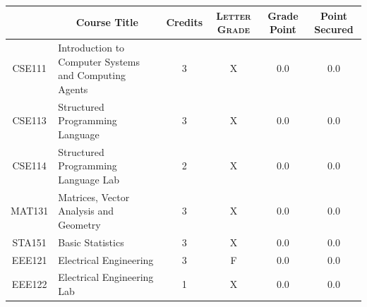 \documentclass[11pt]{article}
\newcommand*{\numtwo}[1]{\pgfmathprintnumber[
                    fixed, precision=2, fixed zerofill=true]{#1}}
\begin{document}
                \begin{center}
                    \renewcommand{\arraystretch}{1.08}
                    
                \begin{tabular}{|c|l|c|>{\scshape}c|c|c|}
                \hline  \rule[-1ex]{0pt}{3.5ex} {\centering{\bf Course Code}} &  \multicolumn{1}{c|}{\textbf{Course Title}}  & {\bf Credits} & {\bf Letter Grade} & {\bf Grade Point} & {\bf Point Secured}  \\ 
                \hline   CSE111 &  Introduction to Computer Systems and Computing Agents		 & 3 & X & 0.0 & 0.0 \\ %
                \hline   CSE113 &  Structured Programming Language		 & 3 & X & 0.0 & 0.0 \\ %
                \hline   CSE114 &  Structured Programming Language Lab		 & 2 & X & 0.0 & 0.0 \\ %
                \hline   MAT131 &  Matrices, Vector Analysis and Geometry		 & 3 & X & 0.0 & 0.0 \\ %
                \hline   STA151 &  Basic Statistics		 & 3 & X & 0.0 & 0.0 \\ %
                \hline   EEE121 &  Electrical Engineering		 & 3 & F & 0.0 & 0.0 \\ %
                \hline   EEE122 &  Electrical Engineering Lab		 & 1 & X & 0.0 & 0.0 \\ %

\hline                %
                \end{tabular}
                \end{center}
                \renewcommand{\arraystretch}{1.03}
\end{document}

